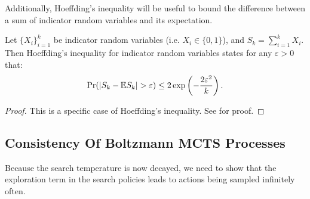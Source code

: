         Additionally, Hoeffding's inequality will be useful to bound the difference between a sum of indicator random variables and its expectation. 
        \begin{theorem} \label{thrm:hoeffding}
            Let $\{X_i\}_{i=1}^k$ be indicator random variables (i.e. $X_i\in\{0,1\}$), and $S_k=\sum_{i=1}^k X_i$. Then Hoeffding's inequality for indicator random variables states for any $\varepsilon > 0$ that:
            \begin{align}
                \Pr(|S_k - \bb{E}S_k|>\varepsilon)\leq 2\exp\left(-\frac{2\varepsilon^2}{k}\right).
            \end{align}
        \end{theorem}
        \begin{proof}
            This is a specific case of Hoeffding's inequality. See  %
            for proof.
        \end{proof}
    
























    
    \subsection{Consistency Of Boltzmann MCTS Processes}

        Because the search temperature is now decayed, we need to show that the exploration term in the search policies leads to actions being sampled infinitely often.



